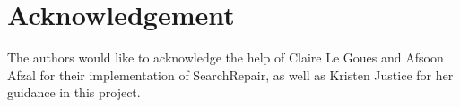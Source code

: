 \documentclass[conference]{IEEEtran}
\begin{document}
\section*{Acknowledgement}
The authors would like to acknowledge the help of Claire Le Goues and Afsoon Afzal for their implementation of SearchRepair, as well as Kristen Justice for her guidance in this project.


\addtolength{\textheight}{-12cm}   %





\end{document}
